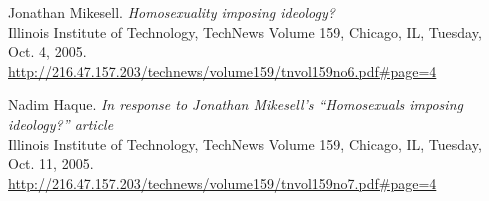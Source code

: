\documentclass[a4paper,12pt]{article}
\begin{document}
\medskip

\begin{thebibliography}{9}

Jonathan Mikesell.
\textit{Homosexuality imposing ideology?} \\
Illinois Institute of Technology, TechNews Volume 159, Chicago, IL, Tuesday, Oct. 4, 2005.
\url{http://216.47.157.203/technews/volume159/tnvol159no6.pdf\#page=4}

Nadim Haque.
\textit{In response to Jonathan Mikesell's “Homosexuals imposing ideology?” article} \\
Illinois Institute of Technology, TechNews Volume 159, Chicago, IL, Tuesday, Oct. 11, 2005.
\url{http://216.47.157.203/technews/volume159/tnvol159no7.pdf\#page=4}


\end{thebibliography}


\newpage

\end{document}
